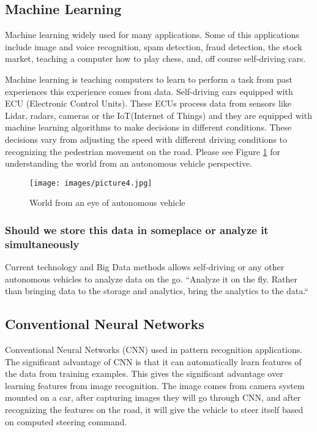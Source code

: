\documentclass[sigconf]{acmart}
\begin{document}
\subsection{Machine Learning}

Machine learning widely used for many applications. Some of this applications include image and voice recognition, spam detection, fraud detection, the stock market, teaching a computer how to play chess, and, off course self-driving cars. 
\par Machine learning is teaching computers to learn to perform a task from past experiences this experience comes from data. Self-driving cars equipped with ECU (Electronic Control Units). These ECUs process data from sensors like Lidar, radars, cameras or the IoT(Internet of Things) and they are equipped with machine learning algorithms to make decisions in different conditions\cite{www-kdnuggets}. These decisions vary from adjusting the speed with different driving conditions to recognizing the pedestrian movement on the road. Please see Figure \ref{fig:Lidar} for understanding the world from an autonomous vehicle perspective\cite{}. 

\begin{figure}[!ht]
  \centering
      \texttt{[image: images/picture4.jpg]}
  \caption{World from an eye of autonomous vehicle}\label{fig:Lidar}
\end{figure}

\subsubsection{Should we store this data in someplace or analyze it simultaneously}
Current technology and Big Data methods allows self-driving or any other autonomous vehicles to analyze data on the go\cite{www-sas}.
    ``Analyze it on the fly. Rather than bringing data to the storage and analytics, bring the analytics to the data\cite{www-sas}.``

\subsection{Conventional Neural Networks}

Conventional Neural Networks (CNN)\cite{nvidia} used in pattern recognition applications. The significant advantage of CNN is that it can automatically learn features of the data from training examples\cite{nvidia}. This gives the significant advantage over learning features from image recognition. The image comes from camera system mounted on a car, after capturing images they will go through CNN, and after recognizing the features on the road, it will give the vehicle to steer itself based on computed steering command\cite{nvidia}. 
\end{document}
